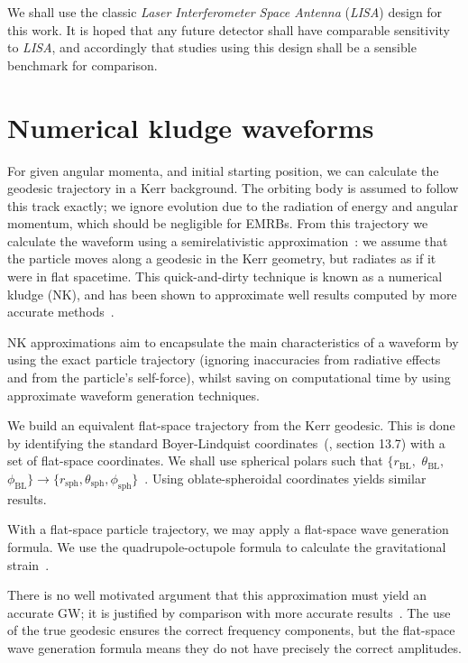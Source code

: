 \documentclass[11pt,twoside]{article}
\begin{document}
We shall use the classic \textit{Laser Interferometer Space Antenna} (\textit{LISA}) design for this work. It is hoped that any future detector shall have comparable sensitivity to \textit{LISA}, and accordingly that studies using this design shall be a sensible benchmark for comparison.


\section{Numerical kludge waveforms}

For given angular momenta, and initial starting position, we can calculate the geodesic trajectory in a Kerr background. The orbiting body is assumed to follow this track exactly; we ignore evolution due to the radiation of energy and angular momentum, which should be negligible for EMRBs. From this trajectory we calculate the waveform using a semirelativistic approximation~\citep{Ruffini1981}: we assume that the particle moves along a geodesic in the Kerr geometry, but radiates as if it were in flat spacetime. This quick-and-dirty technique is known as a numerical kludge (NK), and has been shown to approximate well results computed by more accurate methods~\citep{Babak2007}.

NK approximations aim to encapsulate the main characteristics of a waveform by using the exact particle trajectory (ignoring inaccuracies from radiative effects and from the particle's self-force), whilst saving on computational time by using approximate waveform generation techniques.

We build an equivalent flat-space trajectory from the Kerr geodesic. This is done by identifying the standard Boyer-Lindquist coordinates~(\citealt*{Boyer1967, Hobson2006}, section 13.7) with a set of flat-space coordinates. We shall use spherical polars such that $\{r_\mathrm{BL},$ $\theta_\mathrm{BL},$ $\phi_\mathrm{BL}\} \rightarrow \{r_\mathrm{sph}, \theta_\mathrm{sph}, \phi_\mathrm{sph}\}$~\citep{Gair2005, Babak2007}. Using oblate-spheroidal coordinates yields similar results.

With a flat-space particle trajectory, we may apply a flat-space wave generation formula. We use the quadrupole-octupole formula to calculate the gravitational strain~\citep{Bekenstein1973, Press1977, Yunes2008}.

There is no well motivated argument that this approximation must yield an accurate GW; it is justified by comparison with more accurate results~\citep{Gair2005, Babak2007}. The use of the true geodesic ensures the correct frequency components, but the flat-space wave generation formula means they do not have precisely the correct amplitudes. 
\end{document}
